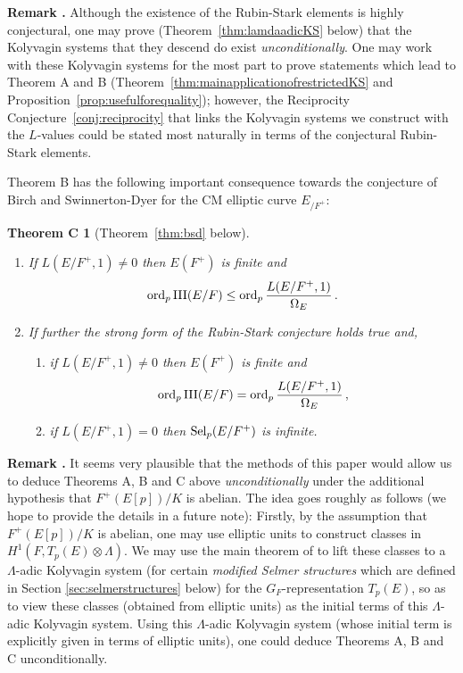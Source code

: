 \documentclass[12pt]{amsart}
\newtheorem*{thmc}{Theorem C}
\numberwithin{equation}{section}
\newenvironment{rem}{\par\medskip\noindent\refstepcounter{thm}
\bgroup{\hspace*{-0.15 cm}\bf{Remark} \thethm.}\bgroup}{\egroup
\egroup\par\medskip} \parskip 2pt
\begin{document}
 \begin{rem}
 \label{rem:removeRSconjhypo}
 Although the existence of the Rubin-Stark elements is highly conjectural, one may prove (Theorem~\ref{thm:lamdaadicKS} below) that the Kolyvagin systems that they descend do exist \emph{unconditionally}. One may work with these Kolyvagin systems for the most part to prove statements which lead to Theorem A and B (Theorem~\ref{thm:mainapplicationofrestrictedKS} and Proposition~\ref{prop:usefulforequality}); however, the Reciprocity Conjecture~\ref{conj:reciprocity} that links the Kolyvagin systems we construct with the $L$-values could be stated most naturally in terms of the conjectural Rubin-Stark elements.
 \end{rem}
 
   Theorem B has the following important consequence towards the conjecture of Birch and Swinnerton-Dyer for the CM elliptic curve $E_{/F^+}$:
 \begin{thmc}[Theorem~\ref{thm:bsd} below]$\,$
 \begin{enumerate} 
\item If $L(E/F^+,1)\neq 0$ then $E(F^+)$ is finite and 
$$\displaystyle{\textup{ord}_p\,\textup{III}(E/F)\leq \textup{ord}_p\, \frac{L(E/F^+,1)}{\Omega_E}}\,.$$ 
\item If further the strong form of the Rubin-Stark conjecture holds true and,
\begin{enumerate}
\item if $L(E/F^+,1)\neq 0$ then $E(F^+)$ is finite and 
$$\displaystyle{\textup{ord}_p\,\textup{III}(E/F)= \textup{ord}_p\, \frac{L(E/F^+,1)}{\Omega_E}}\,,$$ 
\item  if $L(E/F^+,1)=0$ then $\textup{Sel}_p(E/F^+)$ is infinite.
\end{enumerate}
\end{enumerate}
 \end{thmc}
 \begin{rem}
 \label{rem:unconditional}
 It seems very plausible that the methods of this paper would allow us to deduce Theorems A, B and C above \emph{unconditionally} under the additional hypothesis that $F^+(E[p])/K$ is abelian. The idea goes roughly as follows (we hope to provide the details in a future note): Firstly, by the assumption that $F^+(E[p])/K$ is abelian, one may use elliptic units to construct classes in $H^1(F,T_p(E)\otimes{\Lambda})$. We may use the main theorem of \cite{kbb} to lift these classes to a ${\Lambda}$-adic Kolyvagin system (for certain \emph{modified Selmer structures} which are defined in Section \ref{sec:selmerstructures} below) for the $G_F$-representation $T_p(E)$, so as to view these classes (obtained from elliptic units) as the initial terms of this ${\Lambda}$-adic Kolyvagin system. Using this ${\Lambda}$-adic Kolyvagin system (whose initial term is explicitly given in terms of elliptic units), one could deduce Theorems A, B and C unconditionally.
  \end{rem}
  
\end{document}
